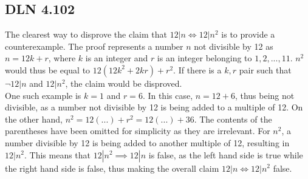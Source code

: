 \documentclass[titlepage]{article}
\begin{document}
\subsection{DLN 4.102}  %

The clearest way to disprove the claim that \( 12|n \iff 12|n^2 \) is to provide a counterexample. The proof represents a number $n$ not divisible by 12 as $n = 12k + r$, where $k$ is an integer and $r$ is an integer belonging to ${1,2,...,11}$. $n^2$ would thus be equal to $12(12k^2 + 2kr) + r^2$. If there is a $k,r$ pair such that $\lnot 12|n$ and $12|n^2$, the claim would be disproved. \\
One such example is $k=1$ and $r=6$. In this case, $n=12+6$, thus being not divisible, as a number not divisible by 12 is being added to a multiple of 12. On the other hand, $n^2=12(...)+r^2=12(...)+36$. The contents of the parentheses have been omitted for simplicity as they are irrelevant. For $n^2$, a number divisible by 12 is being added to another multiple of 12, resulting in $12|n^2$. This means that \( 12|n^2 \implies 12|n \) is false, as the left hand side is true while the right hand side is false, thus making the overall claim \( 12|n \iff 12|n^2 \) false.
\end{document}
